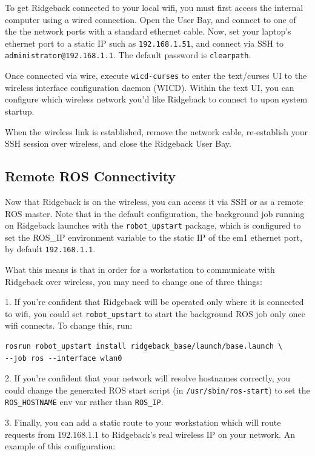 \documentclass[]{clearpath-latex/clearpath-manual}
\begin{document}
To get Ridgeback connected to your local wifi, you must first access the internal computer using a wired connection.
Open the User Bay, and connect to one of the the network ports with a standard
ethernet cable. Now, set your laptop’s ethernet port to a static IP such as \lstinline{192.168.1.51}, and connect via SSH
to \lstinline{administrator@192.168.1.1}. The default password is \lstinline{clearpath}.

Once connected via wire, execute \lstinline{wicd-curses} to enter the text/curses UI to the wireless interface configuration
daemon (WICD). Within the text UI, you can configure which wireless network you’d like Ridgeback to connect to
upon system startup.

When the wireless link is established, remove the network cable, re-establish your SSH session over wireless,
and close the Ridgeback User Bay.

\subsection{Remote ROS Connectivity}

Now that Ridgeback is on the wireless, you can access it via SSH or as a remote ROS master. Note that in
the default configuration, the background job running on Ridgeback launches with the \lstinline{robot_upstart} package,
which is configured to set the ROS\_IP environment variable to the static IP of the em1 ethernet port, by default
\lstinline{192.168.1.1}.

What this means is that in order for a workstation to communicate with Ridgeback over wireless, you may need to
change one of three things:

1. If you’re confident that Ridgeback will be operated only where it is connected to wifi, you could set
\lstinline{robot_upstart} to start the background ROS job only once wifi connects. To change this, run:

\begin{lstlisting} 
rosrun robot_upstart install ridgeback_base/launch/base.launch \
--job ros --interface wlan0
\end{lstlisting}


2. If you’re confident that your network will resolve hostnames correctly, you could change the generated
ROS start script (in \lstinline{/usr/sbin/ros-start}) to set the \lstinline{ROS_HOSTNAME} env var rather than \lstinline{ROS_IP}.

3. Finally, you can add a static route to your workstation which will route requests from 192.168.1.1 to
Ridgeback's real wireless IP on your network. An example of this configuration:
\end{document}
